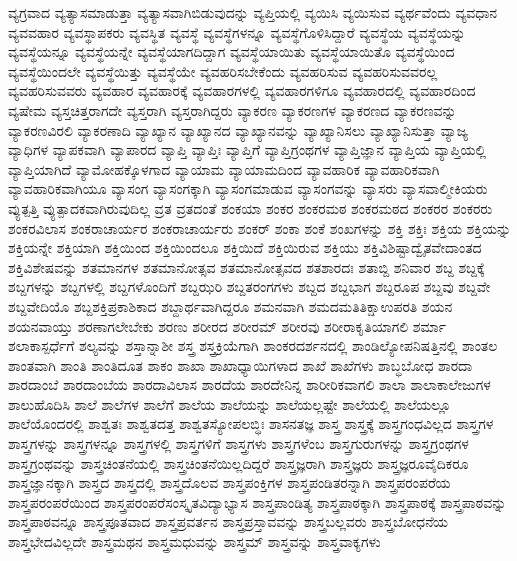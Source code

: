 {ವ್ಯಗ್ರವಾದ
ವ್ಯತ್ಯಾಸಮಾಡುತ್ತಾ
ವ್ಯತ್ಯಾಸವಾಗಿಬಿಡುವುದನ್ನು
ವ್ಯಪ್ತಿಯಲ್ಲಿ
ವ್ಯಯಿಸಿ
ವ್ಯಯಿಸುವ
ವ್ಯರ್ಥವೆಂದು
ವ್ಯವಧಾನ
ವ್ಯವವಹಾರ
ವ್ಯವಸ್ಥಾಪಕರು
ವ್ಯವಸ್ಥಿತ
ವ್ಯವಸ್ಥೆ
ವ್ಯವಸ್ಥೆಗಳನ್ನೂ
ವ್ಯವಸ್ಥೆಗೊಳಿಸಿದ್ದಾರೆ
ವ್ಯವಸ್ಥೆಯ
ವ್ಯವಸ್ಥೆಯನ್ನು
ವ್ಯವಸ್ಥೆಯನ್ನೂ
ವ್ಯವಸ್ಥೆಯನ್ನೇ
ವ್ಯವಸ್ಥೆಯಾಗದಿದ್ದಾಗ
ವ್ಯವಸ್ಥೆಯಾಯಿತು
ವ್ಯವಸ್ಥೆಯಾಯಿತೊ
ವ್ಯವಸ್ಥೆಯಿಂದ
ವ್ಯವಸ್ಥೆಯಿಂದಲೇ
ವ್ಯವಸ್ಥೆಯಿತ್ತು
ವ್ಯವಸ್ಥೆಯೇ
ವ್ಯವಹರಿಸಬೇಕೆಂದು
ವ್ಯವಹರಿಸುವ
ವ್ಯವಹರಿಸುವವರಲ್ಲ
ವ್ಯವಹರಿಸುವವರು
ವ್ಯವಹಾರ
ವ್ಯವಹಾರಕ್ಕೆ
ವ್ಯವಹಾರಗಳಲ್ಲಿ
ವ್ಯವಹಾರಗಳಿಗೂ
ವ್ಯವಹಾರದಲ್ಲಿ
ವ್ಯವಹಾರದಿಂದ
ವ್ಯಷೇಮ
ವ್ಯಸ್ತಚಿತ್ತರಾಗದೇ
ವ್ಯಸ್ತರಾಗಿ
ವ್ಯಸ್ತರಾಗಿದ್ದರು
ವ್ಯಾಕರಣ
ವ್ಯಾಕರಣಗಳ
ವ್ಯಾಕರಣದ
ವ್ಯಾಕರಣವನ್ನು
ವ್ಯಾಕರಣವಿರಲಿ
ವ್ಯಾಕರಣಾದಿ
ವ್ಯಾಖ್ಯಾನ
ವ್ಯಾಖ್ಯಾನದ
ವ್ಯಾಖ್ಯಾನವನ್ನು
ವ್ಯಾಖ್ಯಾನಿಸಲು
ವ್ಯಾಖ್ಯಾನಿಸುತ್ತಾ
ವ್ಯಾಜ್ಯ
ವ್ಯಾಧಿಗಳ
ವ್ಯಾಪಕವಾಗಿ
ವ್ಯಾಪಾರದ
ವ್ಯಾಪ್ತಿ
ವ್ಯಾಪ್ತಿಃ
ವ್ಯಾಪ್ತಿಗೆ
ವ್ಯಾಪ್ತಿಗ್ರಂಥಗಳ
ವ್ಯಾಪ್ತಿಜ್ಞಾನ
ವ್ಯಾಪ್ತಿಯ
ವ್ಯಾಪ್ತಿಯಲ್ಲಿ
ವ್ಯಾಪ್ತಿಯಾಗಿದೆ
ವ್ಯಾಮೋಹಕ್ಕೊಳಗಾದ
ವ್ಯಾಯಾಮ
ವ್ಯಾಯಾಮದಿಂದ
ವ್ಯಾವಹಾರಿಕ
ವ್ಯಾವಹಾರಿಕವಾಗಿ
ವ್ಯಾವಹಾರಿಕವಾಗಿಯೂ
ವ್ಯಾಸಂಗ
ವ್ಯಾಸಂಗಕ್ಕಾಗಿ
ವ್ಯಾಸಂಗಮಾಡುವ
ವ್ಯಾಸಂಗವನ್ನು
ವ್ಯಾಸರು
ವ್ಯಾಸವಾಲ್ಮೀಕಿಯರು
ವ್ಯುತ್ಪತ್ತಿ
ವ್ಯುತ್ಪಾದಕವಾಗಿರುವುದಿಲ್ಲ
ವ್ರತ
ವ್ರತದಂತೆ
ಶಂಕಯಾ
ಶಂಕರ
ಶಂಕರಮಠ
ಶಂಕರಮಠದ
ಶಂಕರರ
ಶಂಕರರು
ಶಂಕರವಿಲಾಸ
ಶಂಕರಾಚಾರ್ಯರ
ಶಂಕರಾಚಾರ್ಯರು
ಶಂಕರ್
ಶಂಕಾ
ಶಂಕೆ
ಶಂಖಗಳನ್ನು
ಶಕ್ತಿ
ಶಕ್ತಿಃ
ಶಕ್ತಿಯ
ಶಕ್ತಿಯನ್ನು
ಶಕ್ತಿಯನ್ನೇ
ಶಕ್ತಿಯಾಗಿ
ಶಕ್ತಿಯಿಂದ
ಶಕ್ತಿಯಿಂದಲೂ
ಶಕ್ತಿಯಿದೆ
ಶಕ್ತಿಯಿರುವ
ಶಕ್ತಿಯು
ಶಕ್ತಿವಿಶಿಷ್ಟಾದ್ವೈತವೇದಾಂತದ
ಶಕ್ತಿವಿಶೇಷವನ್ನು
ಶತಮಾನಗಳ
ಶತಮಾನೋತ್ಸವ
ಶತಮಾನೋತ್ಸವದ
ಶತಶಾರದಃ
ಶತಾಬ್ದಿ
ಶನಿವಾರ
ಶಬ್ದ
ಶಬ್ದಕ್ಕೆ
ಶಬ್ದಗಳನ್ನು
ಶಬ್ದಗಳಲ್ಲಿ
ಶಬ್ದಗಳೊಂದಿಗೆ
ಶಬ್ದಝರಿ
ಶಬ್ದತರಂಗಗಳು
ಶಬ್ದದ
ಶಬ್ದಭಾಗ
ಶಬ್ದರೂಪ
ಶಬ್ದವು
ಶಬ್ದವೇ
ಶಬ್ದವೇದಿಯೊ
ಶಬ್ದಶಕ್ತಿಪ್ರಕಾಶಿಕಾದ
ಶಬ್ದಾರ್ಥವಾಗಿದ್ದರೂ
ಶಮನವಾಗಿ
ಶಮದಮತಿತಿಕ್ಷಾಉಪರತಿ
ಶಯನ
ಶಯನವಾಯ್ತು
ಶರಣಾಗಲೇಬೇಕು
ಶರಣು
ಶರೀರದ
ಶರೀರಮ್
ಶರೀರವು
ಶರೀರಾಕೃತಿಯಾಗಲಿ
ಶರ್ಮಾ
ಶಲಾಕಾಸ್ಪರ್ಧೆಗೆ
ಶಲ್ಯವನ್ನು
ಶಸ್ತಾನ್ನಾಶೀ
ಶಸ್ತ್ರ
ಶಸ್ತ್ರಕ್ರಿಯೆಗಾಗಿ
ಶಾಂಕರದರ್ಶನದಲ್ಲಿ
ಶಾಂಡಿಲ್ಯೋಪನಿಷತ್ತಿನಲ್ಲಿ
ಶಾಂತಲ
ಶಾಂತವಾಗಿ
ಶಾಂತಿ
ಶಾಂತಿದೂತ
ಶಾಕಂ
ಶಾಖಾ
ಶಾಖಾಧ್ಯಾಯಿಗಳಾದ
ಶಾಖೆ
ಶಾಖೆಗಳು
ಶಾಬ್ಧಬೋಧ
ಶಾರದಾ
ಶಾರದಾಂಬೆ
ಶಾರದಾಂಬೆಯ
ಶಾರದಾವಿಲಾಸ
ಶಾರದೆಯ
ಶಾರದೇನಿನ್ನ
ಶಾರೀರಿಕವಾಗಲಿ
ಶಾಲಾ
ಶಾಲಾಕಾಲೇಜುಗಳ
ಶಾಲುಹೊದಿಸಿ
ಶಾಲೆ
ಶಾಲೆಗಳ
ಶಾಲೆಗೆ
ಶಾಲೆಯ
ಶಾಲೆಯನ್ನು
ಶಾಲೆಯಲ್ಲಷ್ಟೇ
ಶಾಲೆಯಲ್ಲಿ
ಶಾಲೆಯಲ್ಲೂ
ಶಾಲೆಯೊಂದರಲ್ಲಿ
ಶಾಶ್ವತಃ
ಶಾಶ್ವತದತ್ತ
ಶಾಶ್ವತಸ್ಯೋಪಲಬ್ಧಿಃ
ಶಾಸನತಜ್ಞ
ಶಾಸ್ತ್ರ
ಶಾಸ್ತ್ರಕ್ಕೆ
ಶಾಸ್ತ್ರಗಂಧವಿಲ್ಲದ
ಶಾಸ್ತ್ರಗಳ
ಶಾಸ್ತ್ರಗಳನ್ನು
ಶಾಸ್ತ್ರಗಳನ್ನೂ
ಶಾಸ್ತ್ರಗಳಲ್ಲಿ
ಶಾಸ್ತ್ರಗಳಿಗೆ
ಶಾಸ್ತ್ರಗಳು
ಶಾಸ್ತ್ರಗಳೆಂಬ
ಶಾಸ್ತ್ರಗುರುಗಳನ್ನು
ಶಾಸ್ತ್ರಗ್ರಂಥಗಳ
ಶಾಸ್ತ್ರಗ್ರಂಥವನ್ನು
ಶಾಸ್ತ್ರಚಿಂತನೆಯಲ್ಲಿ
ಶಾಸ್ತ್ರಚಿಂತನೆಯಿಲ್ಲದಿದ್ದರೆ
ಶಾಸ್ತ್ರಜ್ಞರಾಗಿ
ಶಾಸ್ತ್ರಜ್ಞರು
ಶಾಸ್ತ್ರಜ್ಞರೂವೈದಿಕರೂ
ಶಾಸ್ತ್ರಜ್ಞಾನಕ್ಕಾಗಿ
ಶಾಸ್ತ್ರದ
ಶಾಸ್ತ್ರದಲ್ಲಿ
ಶಾಸ್ತ್ರದೊಲವ
ಶಾಸ್ತ್ರಪಂಕ್ತಿಗಳ
ಶಾಸ್ತ್ರಪಂಡಿತರನ್ನಾಗಿ
ಶಾಸ್ತ್ರಪರಂಪರೆಯ
ಶಾಸ್ತ್ರಪರಂಪರೆಯಿಂದ
ಶಾಸ್ತ್ರಪರಂಪರೆಸಂಸ್ಕೃತವಿದ್ಯಾಭ್ಯಾಸ
ಶಾಸ್ತ್ರಪಾಂಡಿತ್ಯ
ಶಾಸ್ತ್ರಪಾಠಕ್ಕಾಗಿ
ಶಾಸ್ತ್ರಪಾಠಕ್ಕೆ
ಶಾಸ್ತ್ರಪಾಠವನ್ನು
ಶಾಸ್ತ್ರಪಾಠವನ್ನೂ
ಶಾಸ್ತ್ರಪೂತವಾದ
ಶಾಸ್ತ್ರಪ್ರವರ್ತನ
ಶಾಸ್ತ್ರಪ್ರಸ್ತಾವವನ್ನು
ಶಾಸ್ತ್ರಬಲ್ಲವರು
ಶಾಸ್ತ್ರಬೋಧನೆಯ
ಶಾಸ್ತ್ರಭೇದವಿಲ್ಲದೇ
ಶಾಸ್ತ್ರಮಥನ
ಶಾಸ್ತ್ರಮಧುವನ್ನು
ಶಾಸ್ತ್ರಮ್
ಶಾಸ್ತ್ರವನ್ನು
ಶಾಸ್ತ್ರವಾಕ್ಯಗಳು
}
